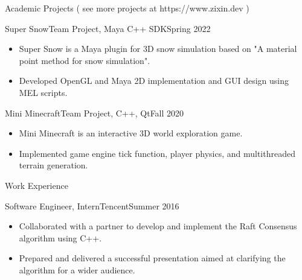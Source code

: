 \documentclass[]{mcdowellcv}
\begin{document}
	\begin{cvsection}{Academic Projects ( see more projects at https://www.zixin.dev )}
		\begin{cvsubsection}{Super Snow}{Team Project, Maya C++ SDK}{Spring 2022}	
			\begin{itemize}
				\item Super Snow is a Maya plugin for 3D snow simulation based on "A material point method for snow simulation".
				\item Developed OpenGL and Maya 2D implementation and GUI design using MEL scripts. 
			\end{itemize}
		\end{cvsubsection}

		\begin{cvsubsection}{Mini Minecraft}{Team Project, C++, Qt}{Fall 2020}	
			\begin{itemize}
				\item Mini Minecraft is an interactive 3D world exploration game.
				\item Implemented game engine tick function, player physics, and multithreaded terrain generation.
			\end{itemize}
		\end{cvsubsection}
	\end{cvsection}

	\begin{cvsection}{Work Experience}
		\begin{cvsubsection}{Software Engineer, Intern}{Tencent}{Summer 2016}	
			\begin{itemize}
				\item Collaborated with a partner to develop and implement the Raft Consensus algorithm using C++.
				\item Prepared and delivered a successful presentation aimed at clarifying the algorithm for a wider audience.
			\end{itemize}
		\end{cvsubsection}
	\end{cvsection}
\end{document}
